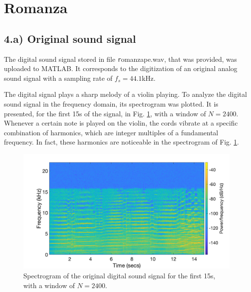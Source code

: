 \documentclass[]{scrartcl}
\title{}
\author{}
\begin{document}
\maketitle

\begin{abstract}

\end{abstract}

\section{Romanza}

\subsection{4.a) Original sound signal}\label{sec:4}
The digital sound signal stored in file {\texttt romanza\textunderscore pe.wav}, that was provided, was uploaded to MATLAB. It corresponds to the digitization of an original analog sound signal with a sampling rate of $f_s = 44.1$kHz.

The digital signal plays a sharp melody of a violin playing. To analyze the digital sound signal in the frequency domain, its spectrogram was plotted. It is presented, for the first 15s of the signal, in Fig. \ref{fig:spctOriginal}, with a window of $N = 2400$. Whenever a certain note is played on the violin, the cords vibrate at a specific combination of harmonics, which are integer multiples of a fundamental frequency. In fact, these harmonics are noticeable in the spectrogram of Fig. \ref{fig:spctOriginal}.

\begin{figure}[htbp]
	\centering
	\includegraphics[width=1\textwidth]{figures/spect_original.png}
	\caption{Spectrogram of the original digital sound signal for the first 15s, with a window of $N = 2400$.}
	\label{fig:spctOriginal}
\end{figure}
\end{document}
